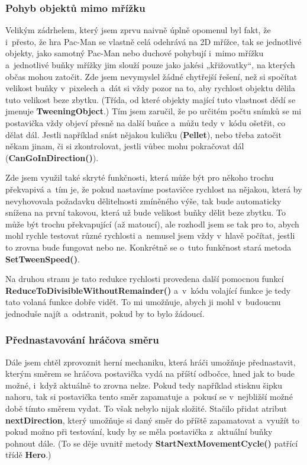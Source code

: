 \documentclass{article}
\begin{document}
\subsubsection{Pohyb objektů mimo mřížku} \label{tweening}
Velikým zádrhelem, který jsem zprvu naivně úplně opomenul byl fakt, že i~přesto, že hra Pac-Man se vlastně celá odehrává na 2D mřížce, tak se jednotlivé objekty, jako samotný Pac-Man nebo duchové pohybují i~mimo mřížku a~jednotlivé buňky mřížky jim slouží pouze jako jakési „křižovatky“, na kterých občas mohou zatočit. Zde jsem nevymyslel žádné chytřejší řešení, než si spočítat velikost buňky v~pixelech a~dát si vždy pozor na to, aby rychlost objektu dělila tuto velikost beze zbytku. (Třída, od které objekty mající tuto vlastnost dědí se jmenuje \textbf{TweeningObject}.) Tím jsem zaručil, že po určitém počtu snímků se mi postavička vždy objeví přesně na další buňce a~můžu tedy v~kódu ošetřit, co dělat dál. Jestli například sníst nějakou kuličku (\textbf{Pellet}), nebo třeba zatočit někam jinam, či si zkontrolovat, jestli vůbec mohu pokračovat dál (\textbf{CanGoInDirection()}).

Zde jsem využil také skryté funkčnosti, která může být pro někoho trochu překvapivá a~tím je, že pokud nastavíme postavičce rychlost na nějakou, která by nevyhovovala požadavku dělitelnosti zmíněného výše, tak bude automaticky snížena na první takovou, která už bude velikost buňky dělit beze zbytku. To může být trochu překvapující (až matoucí), ale rozhodl jsem se tak pro to, abych mohl rychle testovat různé rychlosti a~nemusel jsem vždy v~hlavě počítat, jestli to zrovna bude fungovat nebo ne. Konkrétně se o~tuto funkčnost stará metoda \textbf{SetTweenSpeed()}. 

Na druhou stranu je tato redukce rychlosti provedena další pomocnou funkcí \textbf{ReduceToDivisibleWithoutRemainder()} a~v~kódu volající funkce je tedy tato volaná funkce dobře vidět. To mi umožňuje, abych ji mohl v~budoucnu jednoduše najít a~odstranit, pokud by to bylo žádoucí.

\subsubsection{Přednastavování hráčova směru}
Dále jsem chtěl zprovoznit herní mechaniku, která hráči umožňuje přednastavit, kterým směrem se hráčova postavička vydá na příští odbočce, hned jak to bude možné, i~když aktuálně to zrovna nelze. Pokud tedy například stisknu šipku nahoru, tak si postavička tento směr zapamatuje a~pokusí se v~nejbližší možné době tímto směrem vydat. To však nebylo nijak složité. Stačilo přidat atribut \textbf{nextDirection}, který umožňuje si daný směr do příště zapamatovat a~využít to pokud možno při testování, kudy by se měla postavička z~aktuální buňky pohnout dále. (To se děje uvnitř metody \textbf{StartNextMovementCycle()} patřící třídě \textbf{Hero}.)
\end{document}
